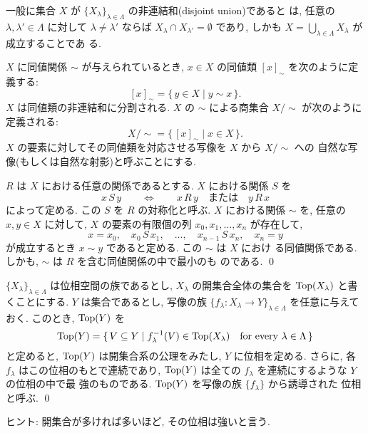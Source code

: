 \documentclass[12pt,twoside]{jarticle}
\def\Top{\mathop{\text{\rm Top}}\nolimits}
\begin{document}
一般に集合 $X$ が %
$\{X_\lambda\}_{\lambda\in\Lambda}$ の非連結和(disjoint union)であると
は, 任意の $\lambda,\lambda'\in\Lambda$ に対して%
$\lambda \ne \lambda'$ ならば %
$X_\lambda \cap X_{\lambda'} = \emptyset$ であり, しかも  %
$X = \bigcup\limits_{\lambda\in\Lambda} X_\lambda$ が成立することであ
る.

$X$ に同値関係 $\sim$ が与えられているとき, %
$x\in X$ の同値類 $[x]_{\sim}$ を次のように定義する:
\[
  [x]_{\sim} = \{\, y \in X \mid y \sim x \,\}.
\] %
$X$ は同値類の非連結和に分割される. %
$X$ の $\sim$ による商集合 $X/{\sim}$ が次のように定義される:
\[
  X/{\sim} = \{\, [x]_{\sim} \mid x \in X \,\}.
\]
$X$ の要素に対してその同値類を対応させる写像を $X$ から $X/{\sim}$ への
自然な写像(もしくは自然な射影)と呼ぶことにする. 

\begin{question}\label{q:gen-equi}
  $R$ は $X$ における任意の関係であるとする. $X$ における関係 $S$ を
  \[
    x\,S\,y 
    \qquad\Longleftrightarrow\qquad
    x\,R\,y \quad\text{または}\quad y\,R\,x
  \] %
  によって定める. この $S$ を $R$ の対称化と呼ぶ. $X$ における関係 %
  $\sim$ を, 任意の $x,y\in X$ に対して, $X$ の要素の有限個の列 %
  $x_0,x_1,\dots,x_n$ が存在して,
  \[
    x = x_0, \quad
    x_0\,S\,x_1, \quad
    \ldots, \quad
    x_{n-1}\,S\,x_n, \quad
    x_n = y
  \] %
  が成立するとき $x \sim y$ であると定める. この $\sim$ は $X$ におけ
  る同値関係である. しかも, $\sim$ は $R$ を含む同値関係の中で最小のも
  のである. \qed
\end{question}

\begin{question}[誘導位相1]\label{q:ind-top1}
  $\{X_\lambda\}_{\lambda\in\Lambda}$ は位相空間の族であるとし,
  $X_\lambda$ の開集合全体の集合を $\Top(X_\lambda)$ と書くことにする. 
  $Y$ は集合であるとし, %
  写像の族 $\{f_\lambda \colon X_\lambda \to Y\}_{\lambda\in\Lambda}$ %
  を任意に与えておく. このとき, $\Top(Y)$ を
  \[
    \Top(Y)
    =
    \{\,
      V \subseteq Y
    \mid
      f_\lambda^{-1}(V) \in \Top(X_\lambda)
      \quad\text{for every $\lambda\in\Lambda$}
    \,\}
  \] %
  と定めると, $\Top(Y)$ は開集合系の公理をみたし, $Y$ に位相を定める. 
  さらに, 各 $f_\lambda$ はこの位相のもとで連続であり, %
  $\Top(Y)$ は全ての $f_\lambda$ を連続にするような $Y$ の位相の中で最
  強のものである. $\Top(Y)$ を写像の族 $\{f_\lambda\}$ から誘導された
  位相と呼ぶ. \qed
\end{question}

\noindent ヒント: 開集合が多ければ多いほど, その位相は強いと言う.
\end{document}
